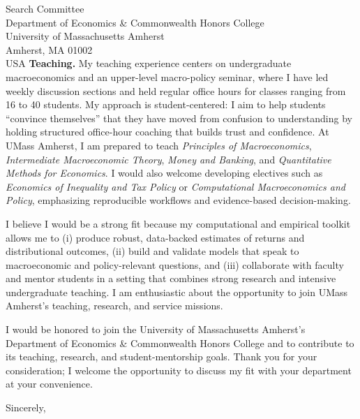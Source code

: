 \documentclass[11pt,letterpaper]{letter}
\begin{document}
\begin{letter}{Search Committee \\
Department of Economics \& Commonwealth Honors College \\
University of Massachusetts Amherst \\
Amherst, MA 01002 \\ USA}
\textbf{Teaching.} My teaching experience centers on undergraduate macroeconomics and an upper-level macro-policy seminar, where I have led weekly discussion sections and held regular office hours for classes ranging from 16 to 40 students. My approach is student-centered: I aim to help students “convince themselves” that they have moved from confusion to understanding by holding structured office-hour coaching that builds trust and confidence. At UMass Amherst, I am prepared to teach \textit{Principles of Macroeconomics}, \textit{Intermediate Macroeconomic Theory}, \textit{Money and Banking}, and \textit{Quantitative Methods for Economics}. I would also welcome developing electives such as \textit{Economics of Inequality and Tax Policy} or \textit{Computational Macroeconomics and Policy}, emphasizing reproducible workflows and evidence-based decision-making.

I believe I would be a strong fit because my computational and empirical toolkit allows me to (i) produce robust, data-backed estimates of returns and distributional outcomes, (ii) build and validate models that speak to macroeconomic and policy-relevant questions, and (iii) collaborate with faculty and mentor students in a setting that combines strong research and intensive undergraduate teaching. I am enthusiastic about the opportunity to join UMass Amherst’s teaching, research, and service missions.

I would be honored to join the University of Massachusetts Amherst’s Department of Economics \& Commonwealth Honors College and to contribute to its teaching, research, and student-mentorship goals. Thank you for your consideration; I welcome the opportunity to discuss my fit with your department at your convenience.

\closing{Sincerely,}

\end{letter}
\end{document}
